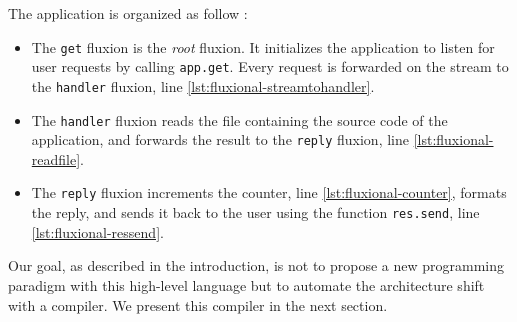 The application is organized as follow :
\begin{itemize}
  \item The \texttt{get} fluxion is the \textit{root} fluxion.
  It initializes the application to listen for user requests by calling \texttt{app.get}.
  Every request is forwarded on the stream to the \texttt{handler} fluxion, line \ref{lst:fluxional-streamtohandler}.
  \item The \texttt{handler} fluxion reads the file containing the source code of the application, and forwards the result to the \texttt{reply} fluxion, line \ref{lst:fluxional-readfile}.
  \item The \texttt{reply} fluxion increments the counter, line \ref{lst:fluxional-counter}, formats the reply, and sends it back to the user using the function \texttt{res.send}, line \ref{lst:fluxional-ressend}.
\end{itemize}

Our goal, as described in the introduction, is not to propose a new programming paradigm with this high-level language but to automate the architecture shift with a compiler.
We present this compiler in the next section.